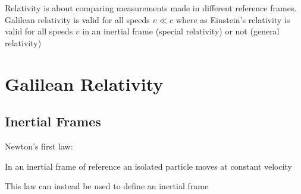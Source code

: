 \documentclass{article}
\begin{document}
    Relativity is about comparing measurements made in different reference frames. Galilean relativity is valid for all speeds \(v\ll c\) where as Einstein's relativity is valid for all speeds \(v\) in an inertial frame (special relativity) or not (general relativity)
    
    \section{Galilean Relativity}
    \subsection{Inertial Frames}
    Newton's first law:
    \begin{displayquote}
        In an inertial frame of reference an isolated particle moves at constant velocity
    \end{displayquote}
    This law can instead be used to define an inertial frame
    
\end{document}
